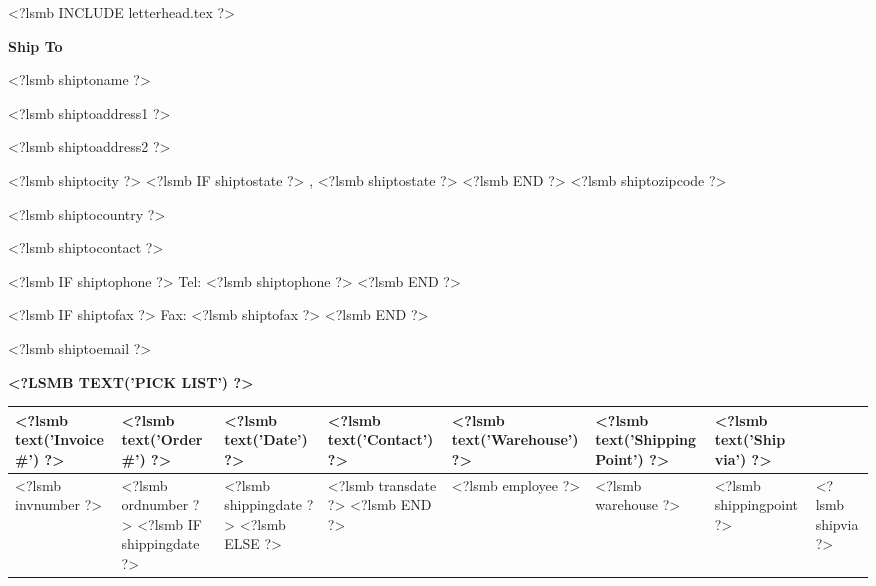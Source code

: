 \documentclass{scrartcl}
\begin{document}
\pagestyle{myheadings}
\thispagestyle{empty}

\fontsize{10pt}{12pt}\selectfont

<?lsmb INCLUDE letterhead.tex ?>


%
%
%
%

\vspace*{0.5cm}

\parbox[t]{.5\textwidth}{
  \textbf{Ship To}
} \hfill

\vspace{0.3cm}

\parbox[t]{.5\textwidth}{
  
<?lsmb shiptoname ?>

<?lsmb shiptoaddress1 ?>

<?lsmb shiptoaddress2 ?>

<?lsmb shiptocity ?>
<?lsmb IF shiptostate ?>
\hspace{-0.1cm}, <?lsmb shiptostate ?>
<?lsmb END ?>
<?lsmb shiptozipcode ?>

<?lsmb shiptocountry ?>
}
\parbox[t]{.5\textwidth}{
  <?lsmb shiptocontact ?>

  <?lsmb IF shiptophone ?>
  Tel: <?lsmb shiptophone ?>
  <?lsmb END ?>

  <?lsmb IF shiptofax ?>
  Fax: <?lsmb shiptofax ?>
  <?lsmb END ?>

  <?lsmb shiptoemail ?>
}
\hfill

\vspace{1cm}

\textbf{\MakeUppercase{<?lsmb text('Pick List') ?>}}
\hfill

\vspace{1cm}

\begin{tabularx}{\textwidth}{*{7}{|X}|} \hline
  \textbf{<?lsmb text('Invoice #') ?>} & \textbf{<?lsmb text('Order #') ?>} 
   & \textbf{<?lsmb text('Date') ?>} & \textbf{<?lsmb text('Contact') ?>}
  & \textbf{<?lsmb text('Warehouse') ?>} 
  & \textbf{<?lsmb text('Shipping Point') ?>} 
  & \textbf{<?lsmb text('Ship via') ?>} \\ [0.5em]
  \hline
  <?lsmb invnumber ?> & <?lsmb ordnumber ?>
  <?lsmb IF shippingdate ?>
  & <?lsmb shippingdate ?>
  <?lsmb ELSE ?>
  & <?lsmb transdate ?>
  <?lsmb END ?>
  & <?lsmb employee ?> & <?lsmb warehouse ?> & <?lsmb shippingpoint ?> & <?lsmb shipvia ?> \\
  \hline
\end{tabularx}
  
\end{document}

